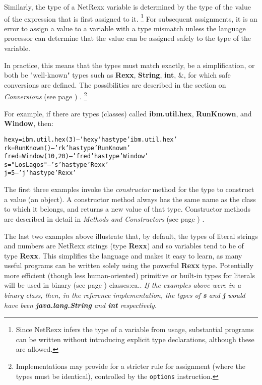 Similarly, the type of a NetRexx variable is determined by the type of
the value of the expression that is first assigned to it.
\footnote{
Since NetRexx infers the type of a variable from usage, substantial
programs can be written without introducing explicit type
declarations, although these are allowed.
}
For subsequent assignments, it is an error to assign a value to a
variable with a type mismatch unless the language processor can
determine that the value can be assigned safely to the type of the
variable.
 
In practice, this means that the types must match exactly, be a
simplification, or both be "well-known" types such
as \textbf{Rexx}, \textbf{String}, \textbf{int}, \&, for which
safe conversions are defined.  The possibilities are described in the
section on  \emph{Conversions} (see page \pageref{refconv}) .
\footnote{
Implementations may provide for a stricter rule for assignment (where
the types must be identical), controlled by the \texttt{options}
instruction.
}
 
For example, if there are types (classes)
called \textbf{ibm.util.hex}, \textbf{RunKnown},
and \textbf{Window}, then:
\begin{alltt}
hexy=ibm.util.hex(3) -- 'hexy' has type 'ibm.util.hex'
rk=RunKnown()        -- 'rk' has type 'RunKnown'
fred=Window(10, 20)  -- 'fred' has type 'Window'
s="Los Lagos"        -- 's' has type 'Rexx'
j=5                  -- 'j' has type 'Rexx'
\end{alltt}
 
The first three examples invoke the \emph{constructor} method for the
type to construct a value (an object).  A constructor method always has
the same name as the class to which it belongs, and returns a new value
of that type.  Constructor methods are described in detail in
 \emph{Methods and Constructors} (see page \pageref{refmethcon}) .
 
The last two examples above illustrate that, by default, the types of
literal strings and numbers are NetRexx strings (type \textbf{Rexx})
and so variables tend to be of type \textbf{Rexx}.
This simplifies the language and makes it easy to learn, as many useful
programs can be written solely using the powerful \textbf{Rexx} type.
Potentially more efficient (though less human-oriented) primitive
or built-in types for literals will be used in  binary (see page \pageref{refbincla}) 
classes:ea..
 \emph{If the examples above were in a binary class, then, in the
reference implementation, the types of \textbf{s} and \textbf{j}
would have been \textbf{java.lang.String} and \textbf{int}
respectively.
}
 
